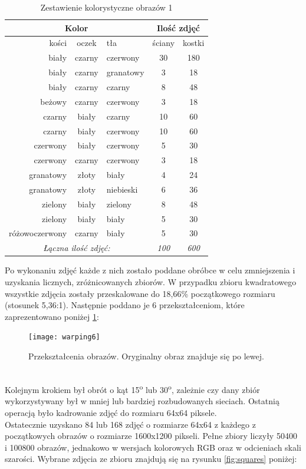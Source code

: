 \begin{table}[h!]
\centering
\begin{tabular}{rcl|cc}
\multicolumn{3}{c}{Kolor} & \multicolumn{2}{c}{Ilość zdjęć} \\ \hline
kości & oczek & tła & ściany & kostki \\ \hline
biały & czarny & czerwony & 30 & 180 \\
biały & czarny & granatowy & 3 & 18 \\
biały & czarny & czarny & 8 & 48 \\
beżowy & czarny & czerwony & 3 & 18 \\
czarny & biały & czarny & 10 & 60 \\
czarny & biały & czerwony & 10 & 60 \\
czerwony & biały & czerwony & 5 & 30 \\
czerwony & czarny & czerwony & 3 & 18 \\
granatowy & złoty & biały & 4 & 24 \\
granatowy & złoty & niebieski & 6 & 36 \\
zielony & biały & zielony & 8 & 48 \\
zielony & biały & biały & 5 & 30 \\
różowoczerwony & czarny & biały & 5 & 30 \\ \hline
\multicolumn{3}{c}{\textit{Łączna ilość zdjęć:}} & \textit{100} & \textit{600}
\end{tabular}
\vspace{0.2cm}
\caption{Zestawienie kolorystyczne obrazów 1}
\label{tab:zestawienie1}
\end{table}
Po wykonaniu zdjęć każde z nich zostało poddane obróbce w celu zmniejszenia i uzyskania licznych,
zróżnicowanych zbiorów. W przypadku zbioru kwadratowego wszystkie zdjęcia zostały przeskalowane
do 18,66\% początkowego rozmiaru (stosunek 5,36:1). Następnie poddano je 6 przekształceniom,
które zaprezentowano poniżej \ref{fig:warping6}:
\begin{figure}[h!]
\centering
\texttt{[image: warping6]}
\caption{Przekształcenia obrazów. Oryginalny obraz znajduje się po lewej.}
\label{fig:warping6}
\end{figure}\\
Kolejnym krokiem był obrót o kąt
15\textsuperscript{o} lub 30\textsuperscript{o}, zależnie czy dany zbiór wykorzystywany był w mniej
lub bardziej rozbudowanych sieciach. Ostatnią operacją było kadrowanie zdjęć do rozmiaru 64x64 piksele.\\
Ostatecznie uzyskano 84 lub 168 zdjęć o rozmiarze 64x64 z każdego
z początkowych obrazów o rozmiarze 1600x1200 pikseli. Pełne zbiory liczyły 50400 i 100800
obrazów, jednakowo w wersjach kolorowych RGB oraz w odcieniach skali szarości.
Wybrane zdjęcia ze zbioru znajdują się na rysunku \ref{fig:squares} poniżej: \newpage

